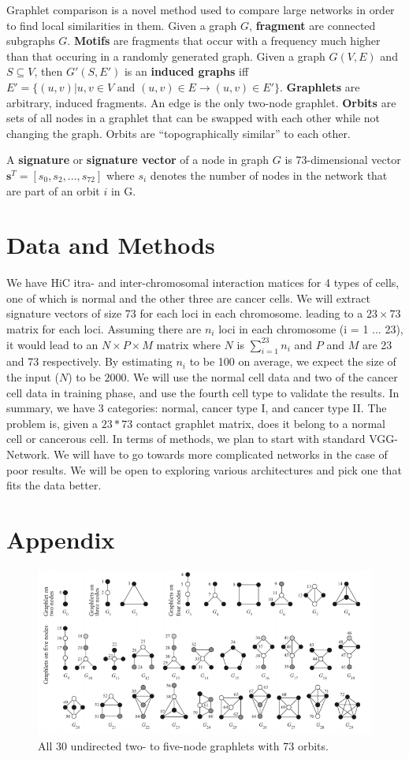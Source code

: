 \documentclass{article}
\begin{document}
Graphlet comparison is a novel method used to compare large networks in order to
find local similarities in them.
Given a graph $G$, \textbf{fragment} are connected subgraphs $G$.
\textbf{Motifs} are fragments that occur with a frequency much higher than
that occuring in a randomly generated graph.
Given a graph $G(V, E)$ and $S \subseteq V$, then $G'(S, E')$
is an \textbf{induced graphs} iff $E' = \{(u, v) | u, v \in V \text{ and } 
(u, v) \in E \rightarrow (u, v) \in E'\}$.
\textbf{Graphlets} are arbitrary, induced fragments.
An edge is the only two-node graphlet.
\textbf{Orbits} are sets of all nodes in a graphlet that can be
swapped with each other while not changing the graph.
Orbits are ``topographically similar'' to each other.

A \textbf{signature} or \textbf{signature vector} of a node in graph $G$ is
73-dimensional vector $\mathbf{s}^T
= [s_0, s_2, ..., s_{72}]$ where $s_i$ denotes the number of nodes in
the network that are part of an orbit $i$ in G. 
\section{Data and Methods}
We have HiC itra- and inter-chromosomal interaction matices for 4
types of cells, one of which is normal and 
the other three are cancer cells. We will extract signature vectors
of size 73 for each loci in each chromosome. leading to a $23 \times 73$
matrix for each loci. Assuming there are 
$n_i$ loci in each chromosome (i = 1 ... 23),
it would lead to an $N \times P \times M$ matrix
where $N$ is $\sum_{i=1}^{23} {n_i}$ and $P$ and $M$ 
are 23 and 73 respectively. By estimating
$n_i$ to be 100 on average, we expect the
size of the input ($N$) to be $2000$.
We will use the normal cell data and two of the cancer cell 
data in training phase, and use the fourth cell type to
validate the results. In summary, we have 3 categories: normal, 
cancer type I, and cancer type II. The problem is, given
a $23 * 73$ contact graphlet matrix, does it belong to
a normal cell or cancerous cell.
In terms of methods, we plan to start with standard
VGG-Network. We will have to go towards more complicated 
networks in the case of poor results. We will be open
to exploring various architectures and pick one that 
 fits the data better.
\section{Appendix}
\begin{figure}[H]
    \centering
    \includegraphics[scale=.5]{graphlets.png}
    \caption{All 30 undirected two- to five-node graphlets
    with 73 orbits.}
    \label{fig:graphletsAndOrbits}
\end{figure}



\end{document}
